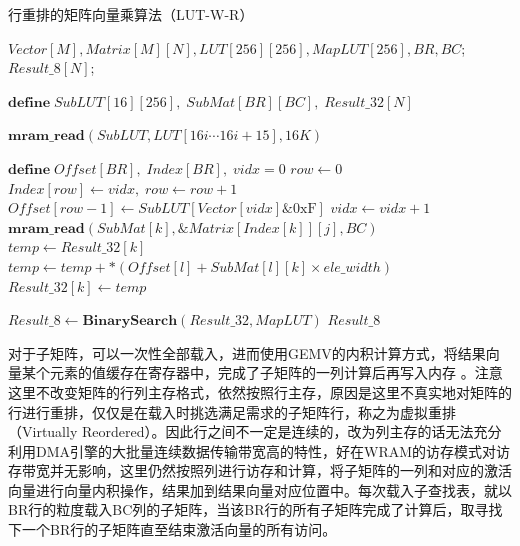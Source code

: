 \begin{algorithm}[!htbp]
    \caption{行重排的矩阵向量乘算法（LUT-W-R）}
    \label{LUT-W-R}
    \begin{algorithmic}[1]
        \Require $Vector[M], Matrix[M][N], LUT[256][256], MapLUT[256], BR, BC$; %
        \Ensure $Result\_8[N]$; %

        \State $\textbf{define}\; SubLUT[16][256],\;SubMat[BR][BC],\;Result\_32[N]$
        
            \State $\textbf{mram\_read}(SubLUT, LUT[16i \cdots 16i + 15], 16K)$
            \Comment{\textcolor{blue}{parallel read}}

            \State $\textbf{define}\; Offset[BR],\;Index[BR],\;vidx=0$
                \State $row \gets 0$
                \Comment{\textcolor{blue}{parallel in BR for each tasklet}}
                        \State $Index[row] \gets vidx,\;row \gets row + 1$
                        \State $Offset[row-1] \gets SubLUT[Vector[vidx] \& \text{0xF}]$
                    \EndIf
                    \State $vidx \gets vidx + 1$
                \EndWhile
                    \Comment{\textcolor{blue}{parallel in BR for each tasklet}}
                        \State $\textbf{mram\_read}(SubMat[k], \&Matrix[Index[k]][j], BC)$
                    \EndFor
                    \Comment{\textcolor{blue}{parallel in BC for each tasklet}}
                        \State $temp \gets Result\_32[k]$
                            \State $temp \gets temp + *(Offset[l] + SubMat[l][k] \times ele\_width)$
                        \EndFor
                        \State $Result\_32[k] \gets temp$
                    \EndFor
                \EndFor
            \EndWhile
        \EndFor

        \State $Result\_8 \gets \textbf{BinarySearch}(Result\_32, MapLUT)$
        \Comment{\textcolor{blue}{parallel in N}}
        \State \Return $Result\_8$
    \end{algorithmic}
\end{algorithm}

对于子矩阵，可以一次性全部载入，进而使用GEMV的内积计算方式，将结果向量某个元素的值缓存在寄存器中，完成了子矩阵的一列计算后再写入内存 。注意这里不改变矩阵的行列主存格式，依然按照行主存，原因是这里不真实地对矩阵的行进行重排，仅仅是在载入时挑选满足需求的子矩阵行，称之为虚拟重排（Virtually Reordered）。因此行之间不一定是连续的，改为列主存的话无法充分利用DMA引擎的大批量连续数据传输带宽高的特性，好在WRAM的访存模式对访存带宽并无影响，这里仍然按照列进行访存和计算，将子矩阵的一列和对应的激活向量进行向量内积操作，结果加到结果向量对应位置中。每次载入子查找表，就以BR行的粒度载入BC列的子矩阵，当该BR行的所有子矩阵完成了计算后，取寻找下一个BR行的子矩阵直至结束激活向量的所有访问。

